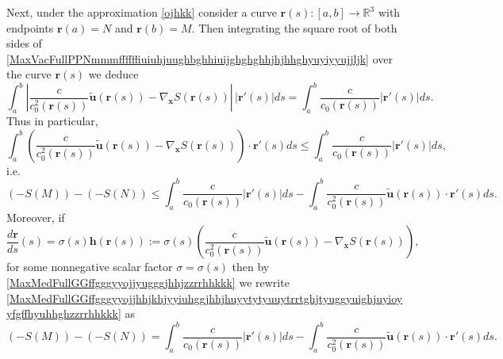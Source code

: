 \documentclass{article}
\theoremstyle{definition}
\theoremstyle{remark}
\renewcommand{\vec}[1]{\mathbf{#1}}
\newcommand{\er}{\eqref}
\newcommand{\er}{\eqref}
\begin{document}
Next, under the approximation \er{ojhkk}
consider a curve $\vec
r(s):[a,b]\to\mathbb{R}^3$ with endpoints $\vec r(a)=N$ and $\vec
r(b)=M$. Then integrating the square root of both sides of
\er{MaxVacFullPPNmmmffffffiuiuhjuughbghhiuijghghghhjhjhhghyuyiyyujjljk}
over the curve $\vec r(s)$ we deduce
\begin{equation}\label{MaxMedFullGGffgggyyojjhhjkhjyyiuhggjhhjhuyytytyuuytrrtghjtyuggyuighjuyioyyfgffhyuhhghzzrrhhkkk}
\int_a^b\left|\frac{c}{c^2_0\left(\vec r(s)\right)}\vec {\tilde
u}\left(\vec r(s)\right)-\nabla_{\vec x}S\left(\vec
r(s)\right)\right|\,\left|\vec
r'(s)\right|ds=\int_a^b\frac{c}{c_0\left(\vec r(s)\right)}\left|\vec
r'(s)\right|ds.
\end{equation}
Thus in particular,
\begin{equation}\label{MaxMedFullGGffgggyyojjhhjkhjyyiuhggjhhjhuyytytyuuytrrtghjtyuggyuighjuyioyyfgffhyuhhghzzrriuihhkkk}
\int_a^b\left(\frac{c}{c^2_0\left(\vec r(s)\right)}\vec {\tilde
u}\left(\vec r(s)\right)-\nabla_{\vec x}S\left(\vec
r(s)\right)\right)\cdot\vec
r'(s)ds\leq\int_a^b\frac{c}{c_0\left(\vec r(s)\right)}\left|\vec
r'(s)\right|ds,
\end{equation}
i.e.
\begin{equation}\label{MaxMedFullGGffgggyyojjhhjkhjyyiuhggjhhjhuyytytyuuytrrtghjtyuggyuighjuyioyyfgffhyuhhghzzrrkkijjhjhhkkk}
\left(-S(M)\right)-
\left(-S(N)\right)\leq\int_a^b\frac{c}{c_0\left(\vec
r(s)\right)}\left|\vec
r'(s)\right|ds-\int_a^b\frac{c}{c^2_0\left(\vec r(s)\right)}\vec
{\tilde u}\left(\vec r(s)\right)\cdot\vec r'(s)ds.
\end{equation}
Moreover, if
\begin{equation}\label{MaxMedFullGGffgggyyojjyugggjhhjzzrrhhkkk}
\frac{d\vec r}{ds}(s)=\sigma(s)\vec h\left(\vec
r(s)\right):=\sigma(s)\left(\frac{c}{c^2_0\left(\vec
r(s)\right)}\vec {\tilde u}\left(\vec r(s)\right)-\nabla_{\vec
x}S\left(\vec r(s)\right)\right),
\end{equation}
for some nonnegative scalar factor $\sigma=\sigma(s)$ then by
\er{MaxMedFullGGffgggyyojjyugggjhhjzzrrhhkkk} we rewrite
\er{MaxMedFullGGffgggyyojjhhjkhjyyiuhggjhhjhuyytytyuuytrrtghjtyuggyuighjuyioyyfgffhyuhhghzzrrhhkkk}
as
\begin{equation}\label{MaxMedFullGGffgggyyojjhhjkhjyyiuhggjhhjhuyytytyuuytrrtghjtyuggyuighjuyioyyfgffhyuhhghzzrrkkhhkkk}
\left(-S(M)\right)-
\left(-S(N)\right)=\int_a^b\frac{c}{c_0\left(\vec
r(s)\right)}\left|\vec
r'(s)\right|ds-\int_a^b\frac{c}{c^2_0\left(\vec r(s)\right)}\vec
{\tilde u}\left(\vec r(s)\right)\cdot\vec r'(s)ds.
\end{equation}
\end{document}
